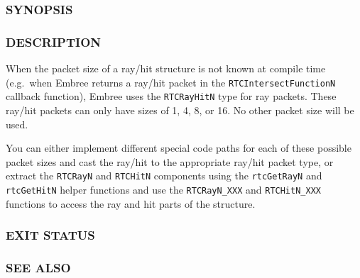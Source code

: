 \subsubsection{SYNOPSIS}\label{synopsis}

\begin{Shaded}
\begin{Highlighting}[]

\OperatorTok{;}

\OperatorTok{*}\OperatorTok{(}\OperatorTok{*}\OperatorTok{,}  \OperatorTok{);}
\OperatorTok{*}\OperatorTok{(}\OperatorTok{*}\OperatorTok{,}  \OperatorTok{);}
\end{Highlighting}
\end{Shaded}

\subsubsection{DESCRIPTION}\label{description}

When the packet size of a ray/hit structure is not known at compile time
(e.g.~when Embree returns a ray/hit packet in the
\texttt{RTCIntersectFunctionN} callback function), Embree uses the
\texttt{RTCRayHitN} type for ray packets. These ray/hit packets can only
have sizes of 1, 4, 8, or 16. No other packet size will be used.

You can either implement different special code paths for each of these
possible packet sizes and cast the ray/hit to the appropriate ray/hit
packet type, or extract the \texttt{RTCRayN} and \texttt{RTCHitN}
components using the \texttt{rtcGetRayN} and \texttt{rtcGetHitN} helper
functions and use the \texttt{RTCRayN\_XXX} and \texttt{RTCHitN\_XXX}
functions to access the ray and hit parts of the structure.

\subsubsection{EXIT STATUS}\label{exit-status}

\subsubsection{SEE ALSO}\label{see-also}

